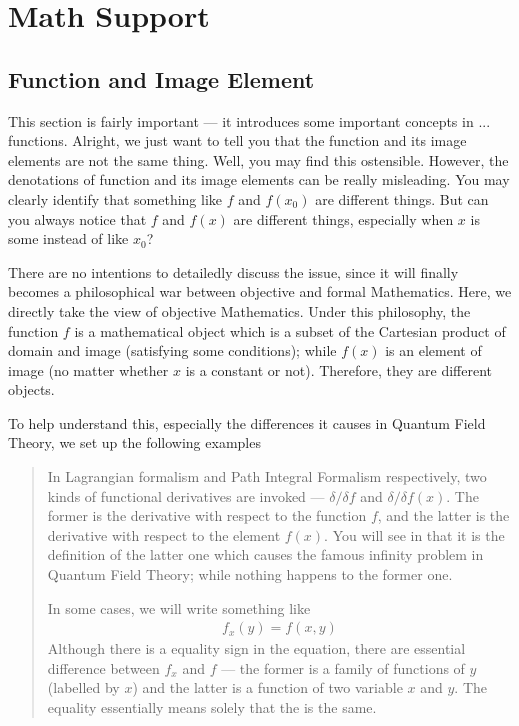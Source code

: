 \documentclass[letterpaper,10pt,english]{sphinxmanual}
\begin{document}
\chapter{Math Support}
\label{\detokenize{mathsup:math-support}}\label{\detokenize{mathsup::doc}}

\section{Function and Image Element}
\label{\detokenize{ms_func_img::doc}}\label{\detokenize{ms_func_img:function-and-image-element}}
This section is fairly important --- it introduces some important concepts in ... functions. Alright, we just want to tell you that the function and its image elements are not the same thing. Well, you may find this ostensible. However, the denotations of function and its image elements can be really misleading. You may clearly identify that something like \(f\) and \(f(x_0)\) are different things. But can you always notice that \(f\) and \(f(x)\) are different things, especially when \(x\) is some  instead of  like \(x_0\)?

There are no intentions to detailedly discuss the issue, since it will finally becomes a philosophical war between objective and formal Mathematics. Here, we directly take the view of objective Mathematics. Under this philosophy, the function \(f\) is a mathematical object which is a subset of the Cartesian product of domain and image (satisfying some conditions); while \(f(x)\) is an element of image (no matter whether \(x\) is a constant or not). Therefore, they are  different objects.

To help understand this, especially the differences it causes in Quantum Field Theory, we set up the following examples
\begin{quote}

 In Lagrangian formalism and Path Integral Formalism respectively, two kinds of functional derivatives are invoked --- \(\delta/\delta f\) and \(\delta/\delta f(x)\). The former is the derivative with respect to the function \(f\), and the latter is the derivative with respect to the element \(f(x)\). You will see in that it is the definition of the latter one which causes the famous infinity problem in Quantum Field Theory; while nothing happens to the former one.

 In some cases, we will write something like
\begin{equation*}
\begin{split}f_x(y)=f(x,y)\end{split}
\end{equation*}
Although there is a equality sign in the equation, there are essential difference between \(f_x\) and \(f\) --- the former is a family of functions of \(y\) (labelled by \(x\)) and the latter is a function of two variable \(x\) and \(y\). The equality essentially means solely that the  is the same.
\end{quote}
\end{document}
